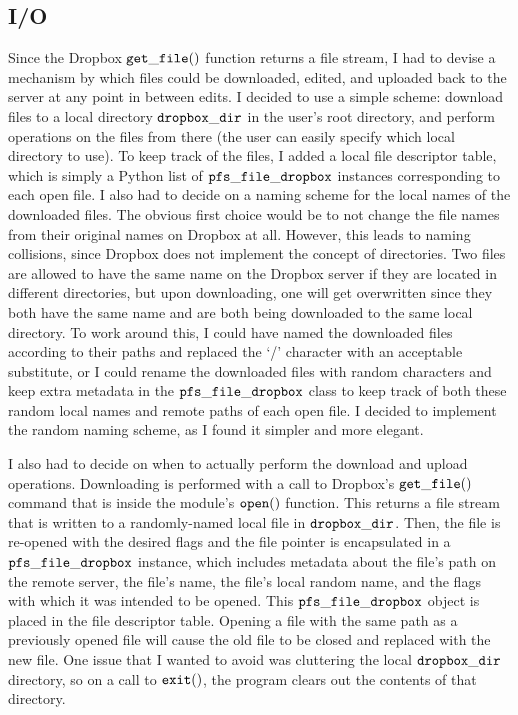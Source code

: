 \documentclass[pageno]{jpaper}
\begin{document}
\subsection{I/O}
Since the Dropbox $\tt{get\_file()}$ function returns a file stream, I had to devise a mechanism by which files could be downloaded, edited, and uploaded back to the server at any point in between edits. I decided to use a simple scheme: download files to a local directory $\tt{dropbox\_dir}$ in the user's root directory, and perform operations on the files from there (the user can easily specify which local directory to use). To keep track of the files, I added a local file descriptor table, which is simply a Python list of $\tt{pfs\_file\_dropbox}$ instances corresponding to each open file. I also had to decide on a naming scheme for the local names of the downloaded files. The obvious first choice would be to not change the file names from their original names on Dropbox at all. However, this leads to naming collisions, since Dropbox does not implement the concept of directories. Two files are allowed to have the same name on the Dropbox server if they are located in different directories, but upon downloading, one will get overwritten since they both have the same name and are both being downloaded to the same local directory. To work around this, I could have named the downloaded files according to their paths and replaced the `/' character with an acceptable substitute, or I could rename the downloaded files with random characters and keep extra metadata in the $\tt{pfs\_file\_dropbox}$ class to keep track of both these random local names and remote paths of each open file. I decided to implement the random naming scheme, as I found it simpler and more elegant.

I also had to decide on when to actually perform the download and upload operations. Downloading is performed with a call to Dropbox's $\tt{get\_file()}$ command that is inside the module's $\tt{open()}$ function. This returns a file stream that is written to a randomly-named local file in $\tt{dropbox\_dir}$. Then, the file is re-opened with the desired flags and the file pointer is encapsulated in a $\tt{pfs\_file\_dropbox}$ instance, which includes metadata about the file's path on the remote server, the file's name, the file's local random name, and the flags with which it was intended to be opened. This $\tt{pfs\_file\_dropbox}$ object is placed in the file descriptor table. Opening a file with the same path as a previously opened file will cause the old file to be closed and replaced with the new file. One issue that I wanted to avoid was cluttering the local $\tt{dropbox\_dir}$ directory, so on a call to $\tt{exit()}$, the program clears out the contents of that directory.
\end{document}
